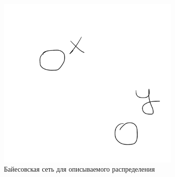 \documentclass[fleqn]{article}
\begin{document}
\begin{figure}[!tbph]
	\centering
	\begin{subfigure}[t]{0.3\textwidth}
		\includegraphics[width=\textwidth]{imgs/img12.png}
		\caption{Байесовская сеть для описываемого распределения}
		\label{fig:treatment_sample_bn}
	\end{subfigure}
	\begin{subfigure}[t]{0.25\textwidth}

\end{subfigure}
\end{figure}
\end{document}
